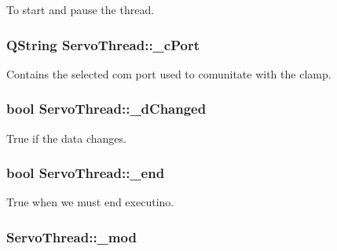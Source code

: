 To start and pause the thread. 

\hypertarget{class_servo_thread_ab52437b31a433c427a6c050f2b1cc959}{}
\subsubsection[{\+\_\+c\+Port}]{\setlength{\rightskip}{0pt plus 5cm}Q\+String Servo\+Thread\+::\+\_\+c\+Port\hspace{0.3cm}{\ttfamily [private]}}\label{class_servo_thread_ab52437b31a433c427a6c050f2b1cc959}


Contains the selected com port used to comunitate with the clamp. 

\hypertarget{class_servo_thread_a2b6ccfeacbb3cc9ac5c34549b9aa3f11}{}
\subsubsection[{\+\_\+d\+Changed}]{\setlength{\rightskip}{0pt plus 5cm}bool Servo\+Thread\+::\+\_\+d\+Changed\hspace{0.3cm}{\ttfamily [private]}}\label{class_servo_thread_a2b6ccfeacbb3cc9ac5c34549b9aa3f11}


True if the data changes. 

\hypertarget{class_servo_thread_acca9896d1a2d1ef68527e6834f81c76c}{}
\subsubsection[{\+\_\+end}]{\setlength{\rightskip}{0pt plus 5cm}bool Servo\+Thread\+::\+\_\+end\hspace{0.3cm}{\ttfamily [private]}}\label{class_servo_thread_acca9896d1a2d1ef68527e6834f81c76c}


True when we must end executino. 

\hypertarget{class_servo_thread_acdecea1688594d3ab7386a6db97dd90d}{}
\subsubsection[{\+\_\+mod}]{ Servo\+Thread\+::\+\_\+mod\hspace{0.3cm}{\ttfamily [private]}}\label{class_servo_thread_acdecea1688594d3ab7386a6db97dd90d}


